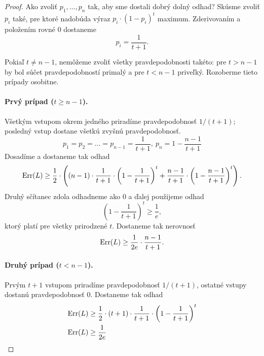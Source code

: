 \begin{proof}
  Ako zvoliť $p_1, \ldots, p_n$ tak, aby sme dostali dobrý dolný
  odhad? Skúsme zvoliť $p_i$ také, pre ktoré nadobúda výraz
  $p_i \cdot (1 - p_i)^t$ maximum. Zderivovaním a položením
  rovné $0$ dostaneme
  $$p_i = \frac{1}{t+1}.$$
  
  Pokiaľ $t \neq n - 1$, nemôžeme zvoliť všetky pravdepodobnosti
  takéto: pre $t > n - 1$ by bol súčet pravdepodobností primalý
  a pre $t < n - 1$ priveľký. Rozoberme tieto prípady osobitne.
  
  \paragraph{Prvý prípad ($t \geq n - 1$).} Všetkým vstupom okrem jedného
  priradíme pravdepodobnosť $1/(t+1)$; posledný vstup dostane všetkú zvyšnú
  pravdepodobnosť.
  $$ p_1 = p_2 = \ldots = p_{n-1} = \frac{1}{t+1},\ p_n = 1 - \frac{n-1}{t+1}$$
  Dosadíme a dostaneme tak odhad
  $$ \mathrm{Err}(L) \geq \frac{1}{2} \cdot \left( (n - 1) \cdot \frac{1}{t+1} \cdot \left( 1 - \frac{1}{t+1} \right)^t + \frac{n-1}{t+1} \cdot \left( 1 - \frac{n-1}{t+1} \right)^t \right). $$
  Druhý sčítanec zdola odhadneme ako $0$ a ďalej použijeme odhad
  $$ \left( 1 - \frac{1}{t+1} \right)^t \geq \frac{1}{e}, $$
  ktorý platí pre všetky prirodzené $t$. Dostaneme tak nerovnosť
  $$ \mathrm{Err}(L) \geq \frac{1}{2e} \cdot \frac{n-1}{t+1}. $$
  
  \paragraph{Druhý prípad ($t < n - 1$).} Prvým $t+1$ vstupom priradíme
  pravdepodobnosť $1/(t+1)$, ostatné vstupy dostanú pravdepodobnosť $0$.
  Dostaneme tak odhad
  \begin{align}
    \mathrm{Err}(L) &\geq \frac{1}{2} \cdot (t + 1) \cdot \frac{1}{t+1} \cdot \left( 1 - \frac{1}{t+1} \right)^t \\
    \mathrm{Err}(L) &\geq \frac{1}{2e}
  \end{align}
\end{proof}

